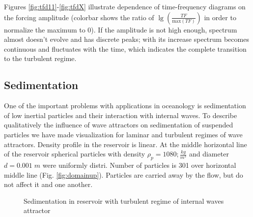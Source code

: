 \documentclass[a4wide,fontsize=12pt]{article}
\begin{document}
Figures \ref{fig:tfd11}-\ref{fig:tfdX} illustrate dependence of time-frequency diagrams on the forcing amplitude (colorbar shows the ratio of $\lg\left(\frac{TF}{\text{max} (TF)}\right)$ in order to normalize the maximum to 0).  If the amplitude is not high enough, spectrum almost doesn't evolve and has discrete peaks; with its increase spectrum becomes continuous and fluctuates with the time, which indicates the complete transition to the turbulent regime.

\subsection{Sedimentation}

One of the important problems with applications in oceanology  is sedimentation of low inertial particles and their interaction with internal waves. To describe qualitatively the influence of wave attractors on sedimentation of suspended particles we have made visualization for laminar and turbulent regimes of wave attractors. Density profile in  the reservoir is linear.
At the middle horizontal line of the reservoir spherical particles with density $\rho_p = 1080;\frac{kg}{m^3}$ and diameter $d=0.001 \; m$ were uniformly distri.  Number of particles is 301 over horizontal middle line (Fig. \ref{fig:domainup}). Particles are carried away by the flow, but do not affect it and one another.

\begin{figure}[h!]
\centering
    \begin{minipage}[t]{0.45\textwidth}
        \centering
        
        \label{fig:turbSed2Da}
    \end{minipage}
    \begin{minipage}[t]{0.45\textwidth}
        \centering
        \label{fig:turbSed2Db}
    \end{minipage}
    \caption{Sedimentation in reservoir with turbulent regime of internal waves attractor}
\end{figure}
\end{document}
